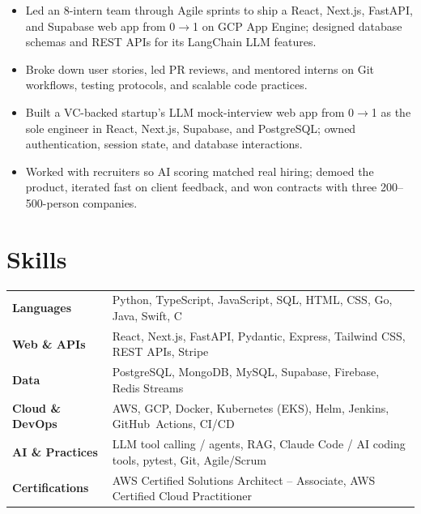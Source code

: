 \documentclass[11pt, letterpaper]{article}
\begin{document}
\vspace{1pt}
\begin{itemize}
  \item Led an 8-intern team through Agile sprints to ship a React, Next.js, FastAPI, and Supabase web app from 0$\to$1 on GCP App Engine; designed database schemas and REST APIs for its LangChain LLM features.
  \item Broke down user stories, led PR reviews, and mentored interns on Git workflows, testing protocols, and scalable code practices.
\end{itemize}

\vspace{1pt}
\begin{itemize}
  \item Built a VC-backed startup's LLM mock-interview web app from 0$\to$1 as the sole engineer in React, Next.js, Supabase, and PostgreSQL; owned authentication, session state, and database interactions.
  \item Worked with recruiters so AI scoring matched real hiring; demoed the product, iterated fast on client feedback, and won contracts with three 200--500-person companies.
\end{itemize}

\section{Skills}
\begin{tabularx}{\textwidth}{@{}l @{\hspace{7pt}} >{\raggedright\arraybackslash}X@{}}
  \textbf{Languages} & Python, TypeScript, JavaScript, SQL, HTML, CSS, Go, Java, Swift, C \\[1pt]
  \textbf{Web \& APIs} & React, Next.js, FastAPI, Pydantic, Express, Tailwind CSS, REST APIs, Stripe \\[1pt]
  \textbf{Data} & PostgreSQL, MongoDB, MySQL, Supabase, Firebase, Redis Streams \\[1pt]
  \textbf{Cloud \& DevOps} & AWS, GCP, Docker, Kubernetes (EKS), Helm, Jenkins, GitHub~Actions, CI/CD \\[1pt]
  \textbf{AI \& Practices} & LLM tool calling / agents, RAG, Claude Code / AI coding tools, pytest, Git, Agile/Scrum \\[1pt]
  \textbf{Certifications} & AWS Certified Solutions Architect -- Associate, AWS Certified Cloud Practitioner \\
\end{tabularx}
\end{document}
